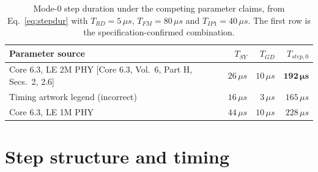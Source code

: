 \documentclass[11pt,a4paper]{article}
\newcommand{\us}{\,\ensuremath{\upmu}s}
\newcommand{\Tsy}{T_{SY}}
\newcommand{\Tgd}{T_{GD}}
\newcommand{\Tfm}{T_{FM}}
\newcommand{\Trd}{T_{RD}}
\newcommand{\Tipone}{T_{IP1}}
\providecommand{\upmu}{\mu}
\newcommand{\core}[1]{\textcolor{rulegrey}{\small[Core 6.3, #1]}}
\begin{document}
\begin{table}[h]
\caption{Mode-0 step duration under the competing parameter claims, from Eq.~\eqref{eq:stepdur} with
$\Trd=5\us$, $\Tfm=80\us$ and $\Tipone=40\us$. The first row is the specification-confirmed
combination.}
\label{tab:stepcandidates}
\centering\small
\begin{tabular}{@{}L{62mm}rrr@{}}
\toprule
Parameter source & $\Tsy$ & $\Tgd$ & $T_{step,0}$ \\
\midrule
Core 6.3, LE 2M PHY \core{Vol.\ 6, Part H, Secs.\ 2, 2.6} & $26\us$ & $10\us$ & $\mathbf{192\us}$ \\
Timing artwork legend (incorrect) & $16\us$ & $3\us$ & $165\us$ \\
Core 6.3, LE 1M PHY & $44\us$ & $10\us$ & $228\us$ \\
\bottomrule
\end{tabular}
\end{table}

\section{Step structure and timing}
\label{sec:timing}
\end{document}
